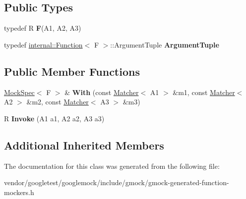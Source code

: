 \subsection*{Public Types}
\begin{DoxyCompactItemize}
\item 
\mbox{\label{classtesting_1_1internal_1_1_function_mocker_3_01_r_07_a1_00_01_a2_00_01_a3_08_4_a8c471830f963b8012785eb3eeca2cc9c}} 
typedef R {\bfseries F}(A1, A2, A3)
\item 
\mbox{\label{classtesting_1_1internal_1_1_function_mocker_3_01_r_07_a1_00_01_a2_00_01_a3_08_4_a347dcf4c054a5f1fbd0e2f0ad1c5e2f3}} 
typedef \hyperlink{structtesting_1_1internal_1_1_function}{internal\+::\+Function}$<$ F $>$\+::Argument\+Tuple {\bfseries Argument\+Tuple}
\end{DoxyCompactItemize}
\subsection*{Public Member Functions}
\begin{DoxyCompactItemize}
\item 
\mbox{\label{classtesting_1_1internal_1_1_function_mocker_3_01_r_07_a1_00_01_a2_00_01_a3_08_4_a349af66650c6d0401dd1c0081773c25a}} 
\hyperlink{classtesting_1_1internal_1_1_mock_spec}{Mock\+Spec}$<$ F $>$ \& {\bfseries With} (const \hyperlink{classtesting_1_1_matcher}{Matcher}$<$ A1 $>$ \&m1, const \hyperlink{classtesting_1_1_matcher}{Matcher}$<$ A2 $>$ \&m2, const \hyperlink{classtesting_1_1_matcher}{Matcher}$<$ A3 $>$ \&m3)
\item 
\mbox{\label{classtesting_1_1internal_1_1_function_mocker_3_01_r_07_a1_00_01_a2_00_01_a3_08_4_a2afad9e39ca64acc6b178fa415907c5b}} 
R {\bfseries Invoke} (A1 a1, A2 a2, A3 a3)
\end{DoxyCompactItemize}
\subsection*{Additional Inherited Members}


The documentation for this class was generated from the following file\+:\begin{DoxyCompactItemize}
\item 
vendor/googletest/googlemock/include/gmock/gmock-\/generated-\/function-\/mockers.\+h\end{DoxyCompactItemize}
